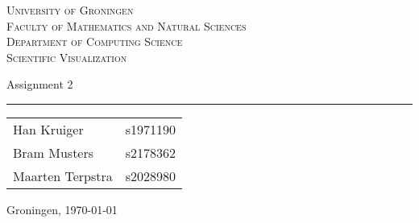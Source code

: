 
\begin{titlepage}

\newcommand{\titleinfo} {Scientific Visualization}
\newcommand{\authorinfo} {Han Kruiger - s1971190 \\ Bram Musters - s2178362 \\ Maarten Terpstra - s2028980}

\center
\textsc{\Large University of Groningen} \\[0.2cm]
\textsc{Faculty of Mathematics and Natural Sciences} \\[0.2cm]
\textsc{Department of Computing Science} \\[0.5cm]
\textsc{\large \titleinfo} \\[1.5cm]


\begin{flushleft}
{\LARGE Assignment 2}
{\rule{\linewidth}{0.1mm}}
\end{flushleft}


\begin{flushright}
	\large
	\begin{tabular}{ll}
		Han Kruiger & s1971190 \\
		Bram Musters & s2178362 \\
		Maarten Terpstra & s2028980 \\
	\end{tabular}
\end{flushright}

\vfill

Groningen, \today\\

\end{titlepage}
